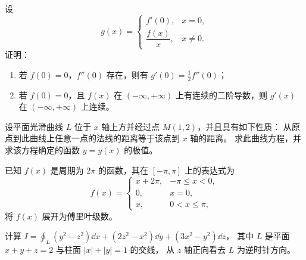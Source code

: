 \begin{question}[index=17,points=10]
设
\[
g(x)=\begin{cases}
f'(0),&x=0,\\[2pt]
\dfrac{f(x)}x,&x\ne0.
\end{cases}
\]
证明：
\begin{enumerate}[label=（\arabic*）,leftmargin=2.5em,labelsep=.4em,itemsep=3pt,topsep=3pt]
\item 若 $f(0)=0$，$f''(0)$ 存在，则有 $\displaystyle g'(0)=\frac12f''(0)$；
\item 若 $f(0)=0$，且 $f(x)$ 在 $(-\infty,+\infty)$ 上有连续的二阶导数，则 $g'(x)$ 在 $(-\infty,+\infty)$ 上连续。
\end{enumerate}
\end{question}
\QuestionBreak\WorkSpace

\begin{question}[index=18,points=12]
设平面光滑曲线 $L$ 位于 $x$ 轴上方并经过点 $M(1,2)$，并且具有如下性质：
从原点到此曲线上任意一点的法线的距离等于该点到 $x$ 轴的距离。
求此曲线方程，并求该方程确定的函数 $y=y(x)$ 的极值。
\end{question}
\QuestionBreak\WorkSpace\WorkPageBreak

\begin{question}[index=19,points=12]
已知 $f(x)$ 是周期为 $2\pi$ 的函数，其在 $[-\pi,\pi]$ 上的表达式为
\[
f(x)=\begin{cases}
x+2\pi,&-\pi\le x<0,\\
0,&x=0,\\
x,&0<x\le\pi,
\end{cases}
\]
将 $f(x)$ 展开为傅里叶级数。
\end{question}
\QuestionBreak\WorkSpace

\begin{question}[index=20,points=12]
计算 $\displaystyle I=\oint_L(y^2-z^2)\dd x+(2z^2-x^2)\dd y+(3x^2-y^2)\dd z$，
其中 $L$ 是平面 $x+y+z=2$ 与柱面 $|x|+|y|=1$ 的交线，
从 $z$ 轴正向看去 $L$ 为逆时针方向。
\end{question}
\QuestionBreak\WorkSpace\WorkPageBreak

